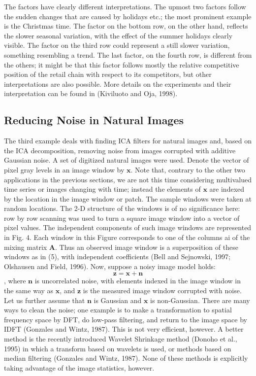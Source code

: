 \documentclass[12pt, a4paper, onecolumn]{IEEEtran}
\begin{document}
The factors have clearly different interpretations. The upmost two factors follow the sudden changes that are caused by holidays etc.; the most prominent example is the Christmas time. The factor on the bottom row, on the other hand, reflects the slower seasonal variation, with the effect of the summer holidays clearly visible. The factor on the third row could represent a still slower variation, something resembling a trend. The last factor, on the fourth row, is different from the others; it might be that this factor follows mostly the relative competitive position of the retail chain with respect to its competitors, but other interpretations are also possible.
More details on the experiments and their interpretation can be found in (Kiviluoto and Oja, 1998).
\subsection{Reducing Noise in Natural Images}
The third example deals with finding ICA filters for natural images and, based on the ICA decomposition, removing noise from images corrupted with additive Gaussian noise.
A set of digitized natural images were used. Denote the vector of pixel gray levels in an image window by $\mathbf{x}$. Note that, contrary to the other two applications in the previous sections, we are not this time considering multivalued time series or images changing with time; instead the elements of $\mathbf{x}$ are indexed by the location in the image window or patch. The sample windows were taken at random locations. The 2-D structure of the windows is of no significance here: row by row scanning was used to turn a square image window into a vector of pixel values. The independent components of such image windows are represented in Fig. 4. Each window in this Figure corresponds to one of the columns ai of the mixing matrix $\mathbf{A}$. Thus an observed image window is a superposition of these windows as in (5), with independent coefficients (Bell and Sejnowski, 1997; Olshausen and Field, 1996).
Now, suppose a noisy image model holds: $$\mathbf{z=x+n}$$, where $\mathbf{n}$ is uncorrelated noise, with elements indexed in the image window in the same way as $\mathbf{x}$, and $\mathbf{z}$ is the measured image window corrupted with noise. Let us further assume that $\mathbf{n}$ is Gaussian and $\mathbf{x}$ is non-Gaussian. There are many ways to clean the noise; one example is to make a transformation to spatial frequency space by DFT, do low-pass filtering, and return to the image space by IDFT (Gonzales and Wintz, 1987). This is not very efficient, however. A better method is the recently introduced Wavelet Shrinkage method (Donoho et al., 1995) in which a transform based on wavelets is used, or methods based on median filtering (Gonzales and Wintz, 1987). None of these methods is explicitly taking advantage of the image statistics, however. \
\end{document}
